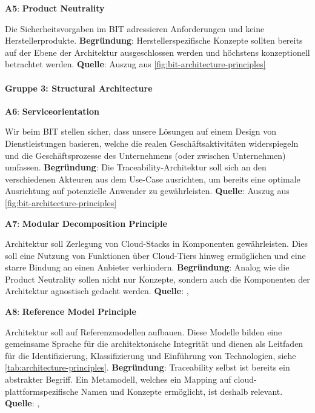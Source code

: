 \textbf{A5}: \textbf{Product Neutrality} \hypertarget{architecture-a5}{}

Die Sicherheitsvorgaben im BIT adressieren Anforderungen und keine Herstellerprodukte.
\textbf{Begründung}: Herstellerspezifische Konzepte sollten bereits auf der Ebene der Architektur ausgeschlossen werden und höchstens konzeptionell betrachtet werden.
\textbf{Quelle}: Auszug aus \autoref{fig:bit-architecture-principles}

\paragraph{Gruppe 3: Structural Architecture}

\textbf{A6}: \textbf{Serviceorientation} \hypertarget{architecture-a6}{}

Wir beim BIT stellen sicher, dass unsere Lösungen auf einem Design von Dienstleistungen basieren, welche die realen Geschäftsaktivitäten widerspiegeln und die Geschäftsprozesse des Unternehmens (oder zwischen Unternehmen) umfassen.
\textbf{Begründung}: Die Traceability-Architektur soll sich an den verschiedenen Akteuren aus dem Use-Case ausrichten, um bereits eine optimale Ausrichtung auf potenzielle Anwender zu gewährleisten.
\textbf{Quelle}: Auszug aus \autoref{fig:bit-architecture-principles}

\textbf{A7}: \textbf{Modular Decomposition Principle} \hypertarget{architecture-a7}{}

Architektur soll Zerlegung von Cloud-Stacks in Komponenten gewährleisten. Dies soll eine Nutzung von Funktionen über Cloud-Tiers hinweg ermöglichen und eine starre Bindung an einen Anbieter verhindern.
\textbf{Begründung}: Analog wie die Product Neutrality sollen nicht nur Konzepte, sondern auch die Komponenten der Architektur agnostisch gedacht werden.
\textbf{Quelle}: \cite{papazoglou_cloud_2012}, \cite{tritsiniotis_get_2016}

\textbf{A8}: \textbf{Reference Model Principle}\hypertarget{architecture-a8}{}

Architektur soll auf Referenzmodellen aufbauen. Diese Modelle bilden eine gemeinsame Sprache für die architektonische Integrität und dienen als Leitfaden für die Identifizierung, Klassifizierung und Einführung von Technologien, siehe \autoref{tab:architecture-principles}.
\textbf{Begründung}: Traceability selbst ist bereits ein abstrakter Begriff. Ein Metamodell, welches ein Mapping auf cloud-plattformspezifische Namen und Konzepte ermöglicht, ist deshalb relevant.
\textbf{Quelle}: \cite{kratzke_clouns_2016}, \cite{zhang_ccoa_2009}

